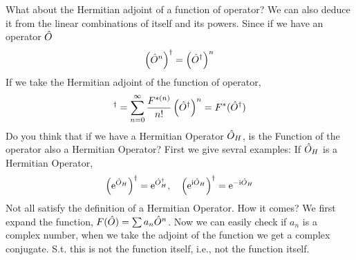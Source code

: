 What about the Hermitian adjoint of a function of operator? We can also deduce it from the linear combinations of itself and its powers. Since if we have an operator $\hat{O}$
\begin{eqnarray}
    \left(\hat{O}^n\right)^ \dag = \left( \hat{O}^ \dag \right)^n
\end{eqnarray}
If we take the Hermitian adjoint of the function of operator, 
\begin{eqnarray}
    [F(\oO)]^ \dag = \sum_{n=0}^{\infty} \frac{F^{*(n)}}{n!} \left(\oO^ \dag\right)^n = F^* (\oO^ \dag)
\end{eqnarray}
Do you think that if we have a Hermitian Operator $\hat{O}_H$, is the Function of the operator also a Hermitian Operator? First we give sevral examples: If $\hat{O}_H$ is a Hermitian Operator, 
\begin{eqnarray}
    \left(\mathrm{e}^{\hat{O}_H}\right)^ \dag = \mathrm{e}^{\hat{O}_H^ \dag}, \quad \left(\mathrm{e}^{\mathrm{i} \hat{O}_H}\right)^ \dag = \mathrm{e}^{- \mathrm{i} \hat{O}_H} \label{eq:exp_dag}
\end{eqnarray}
Not all satisfy the definition of a Hermitian Operator. How it comes? We first expand the function, $F(\hat{O}) = \sum a_n \hat{O}^n$. Now we can easily check if $a_n$ is a complex number, when we take the adjoint of the function we get a complex conjugate. S.t. this is not the function itself, i.e., not the function itself. 


